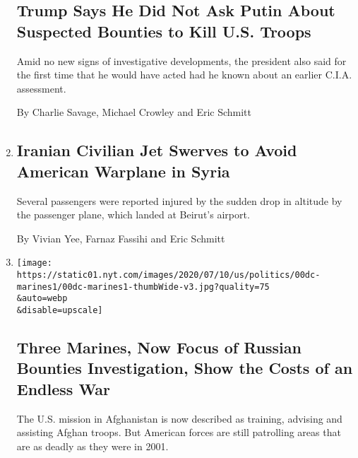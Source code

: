 \begin{enumerate}
  \hypertarget{trump-says-he-did-not-ask-putin-about-suspected-bounties-to-kill-us-troops}{%
  \subsection{Trump Says He Did Not Ask Putin About Suspected Bounties
  to Kill U.S.
  Troops}\label{trump-says-he-did-not-ask-putin-about-suspected-bounties-to-kill-us-troops}}

  Amid no new signs of investigative developments, the president also
  said for the first time that he would have acted had he known about an
  earlier C.I.A. assessment.

  By Charlie Savage, Michael Crowley and Eric Schmitt
\item
  \href{/2020/07/23/world/middleeast/iran-warplanes-syria.html}{}

  \hypertarget{iranian-civilian-jet-swerves-to-avoid-american-warplane-in-syria}{%
  \subsection{Iranian Civilian Jet Swerves to Avoid American Warplane in
  Syria}\label{iranian-civilian-jet-swerves-to-avoid-american-warplane-in-syria}}

  Several passengers were reported injured by the sudden drop in
  altitude by the passenger plane, which landed at Beirut's airport.

  By Vivian Yee, Farnaz Fassihi and Eric Schmitt
\item
  \href{/2020/07/14/us/politics/afghanistan-russia-bounties-marines.html}{}

  \texttt{[image: https://static01.nyt.com/images/2020/07/10/us/politics/00dc-marines1/00dc-marines1-thumbWide-v3.jpg?quality=75\\\&auto=webp\\\&disable=upscale]}

  \hypertarget{three-marines-now-focus-of-russian-bounties-investigation-show-the-costs-of-an-endless-war}{%
  \subsection{Three Marines, Now Focus of Russian Bounties
  Investigation, Show the Costs of an Endless
  War}\label{three-marines-now-focus-of-russian-bounties-investigation-show-the-costs-of-an-endless-war}}

  The U.S. mission in Afghanistan is now described as training, advising
  and assisting Afghan troops. But American forces are still patrolling
  areas that are as deadly as they were in 2001.


\end{enumerate}
